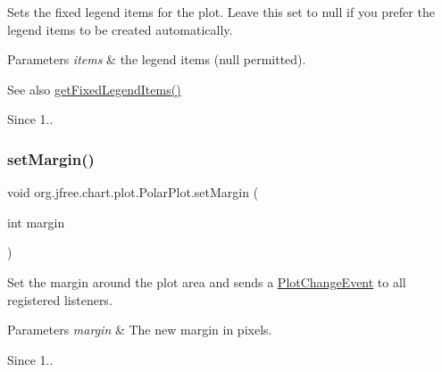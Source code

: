 Sets the fixed legend items for the plot. Leave this set to {\ttfamily null} if you prefer the legend items to be created automatically.


\begin{DoxyParams}{Parameters}
{\em items} & the legend items ({\ttfamily null} permitted).\\
\hline
\end{DoxyParams}
\begin{DoxySeeAlso}{See also}
\mbox{\hyperlink{classorg_1_1jfree_1_1chart_1_1plot_1_1_polar_plot_af0152e32f5a043b5313c82db825d0154}{get\+Fixed\+Legend\+Items()}}
\end{DoxySeeAlso}
\begin{DoxySince}{Since}
1.. 
\end{DoxySince}
\mbox{\label{classorg_1_1jfree_1_1chart_1_1plot_1_1_polar_plot_aea960472c437f64e67a83331428ba4f6}} 
\subsubsection{\texorpdfstring{set\+Margin()}{setMargin()}}
{\footnotesize\ttfamily void org.\+jfree.\+chart.\+plot.\+Polar\+Plot.\+set\+Margin (\begin{DoxyParamCaption}\item[{int}]{margin }\end{DoxyParamCaption})}

Set the margin around the plot area and sends a \mbox{\hyperlink{}{Plot\+Change\+Event}} to all registered listeners.


\begin{DoxyParams}{Parameters}
{\em margin} & The new margin in pixels.\\
\hline
\end{DoxyParams}
\begin{DoxySince}{Since}
1.. 
\end{DoxySince}
\mbox{\label{classorg_1_1jfree_1_1chart_1_1plot_1_1_polar_plot_a975386d543478708d2273a841aa96455}} 
